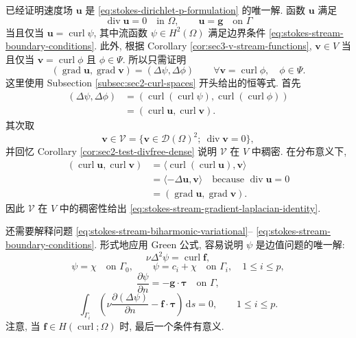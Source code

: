 \begin{Proof}
已经证明速度场 $\mathbf{u}$ 是
\eqref{eq:stokes-dirichlet-p-formulation} 的唯一解.
函数 $\mathbf{u}$ 满足
\[
\operatorname{div}\mathbf{u}=0\quad\text{in }\Omega,
\qquad
\mathbf{u}=\mathbf{g}\quad\text{on }\Gamma
\]
当且仅当 $\mathbf{u}=\operatorname{curl}\psi$,
其中流函数 $\psi\in H^2(\Omega)$ 满足边界条件
\eqref{eq:stokes-stream-boundary-conditions}.
此外, 根据 Corollary \ref{cor:sec3-v-stream-functions},
$\mathbf{v}\in V$ 当且仅当
$\mathbf{v}=\operatorname{curl}\phi$ 且 $\phi\in\Psi$.
所以只需证明
\begin{equation}\label{eq:stokes-stream-gradient-laplacian-identity}
(\operatorname{grad}\mathbf{u},
\operatorname{grad}\mathbf{v})
=
(\Delta\psi,\Delta\phi)
\qquad
\forall\mathbf{v}=\operatorname{curl}\phi,
\quad \phi\in\Psi.
\end{equation}
这里使用 Subsection \ref{subsec:sec2-curl-spaces} 开头给出的恒等式.
首先
\[
\begin{aligned}
(\Delta\psi,\Delta\phi)
&=(\operatorname{curl}(\operatorname{curl}\psi),
\operatorname{curl}(\operatorname{curl}\phi))\\
&=(\operatorname{curl}\mathbf{u},
\operatorname{curl}\mathbf{v}).
\end{aligned}
\]
其次取
\[
\mathbf{v}\in\mathcal{V}
=\{\mathbf{v}\in\mathcal{D}(\Omega)^2;
\ \operatorname{div}\mathbf{v}=0\},
\]
并回忆 Corollary \ref{cor:sec2-test-divfree-dense} 说明
$\mathcal{V}$ 在 $V$ 中稠密. 在分布意义下,
\[
\begin{aligned}
(\operatorname{curl}\mathbf{u},
\operatorname{curl}\mathbf{v})
&=\langle
\operatorname{curl}(\operatorname{curl}\mathbf{u}),
\mathbf{v}\rangle\\
&=\langle-\Delta\mathbf{u},\mathbf{v}\rangle
\quad\text{because }\operatorname{div}\mathbf{u}=0\\
&=(\operatorname{grad}\mathbf{u},
\operatorname{grad}\mathbf{v}).
\end{aligned}
\]
因此 $\mathcal{V}$ 在 $V$ 中的稠密性给出
\eqref{eq:stokes-stream-gradient-laplacian-identity}.
\end{Proof}

还需要解释问题
\eqref{eq:stokes-stream-biharmonic-variational}--
\eqref{eq:stokes-stream-boundary-conditions}.
形式地应用 Green 公式, 容易说明 $\psi$ 是边值问题的唯一解:
\[
\nu\Delta^2\psi=\operatorname{curl}\mathbf{f},
\]
\[
\psi=\chi\quad\text{on }\Gamma_0,
\qquad
\psi=c_i+\chi\quad\text{on }\Gamma_i,
\quad 1\le i\le p,
\]
\[
\frac{\partial\psi}{\partial n}
=-\mathbf{g}\cdot\boldsymbol{\tau}
\quad\text{on }\Gamma,
\]
\[
\int_{\Gamma_i}
\left(
\nu\frac{\partial(\Delta\psi)}{\partial n}
-\mathbf{f}\cdot\boldsymbol{\tau}
\right)\,\mathrm{d}s
=0,
\qquad 1\le i\le p.
\]
注意, 当 $\mathbf{f}\in H(\operatorname{curl};\Omega)$ 时,
最后一个条件有意义.

